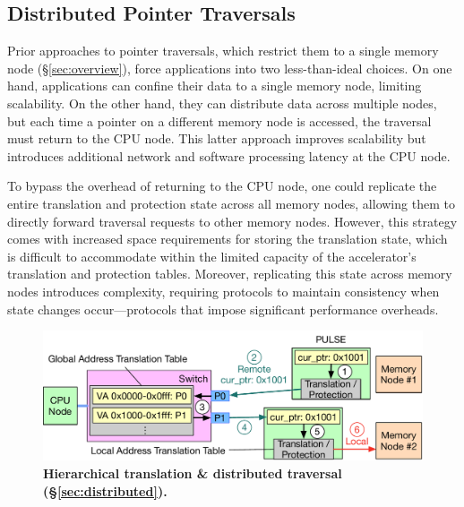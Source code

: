 \subsection{Distributed Pointer Traversals}
\label{ssec:distributed}

Prior approaches to pointer traversals, which restrict them to a single memory node (\S\ref{sec:overview}), force applications into two less-than-ideal choices. On one hand, applications can confine their data to a single memory node, limiting scalability. On the other hand, they can distribute data across multiple nodes, but each time a pointer on a different memory node is accessed, the traversal must return to the CPU node. This latter approach improves scalability but introduces additional network and software processing latency at the CPU node.

To bypass the overhead of returning to the CPU node, one could replicate the entire translation and protection state across all memory nodes, allowing them to directly forward traversal requests to other memory nodes. However, this strategy comes with increased space requirements for storing the translation state, which is difficult to accommodate within the limited capacity of the accelerator's translation and protection tables. Moreover, replicating this state across memory nodes introduces complexity, requiring protocols to maintain consistency when state changes occur—protocols that impose significant performance overheads.


\begin{figure}[t]
\centering
\includegraphics[width=0.96\columnwidth]{fig/pulse/hierarchical.pdf}
\vspace{-1.4em}
\caption[Hierarchical translation \& distributed traversal]{\textbf{Hierarchical translation \& distributed traversal (\S\ref{sec:distributed}).}}
\label{fig:hierarchical}%
\end{figure}

